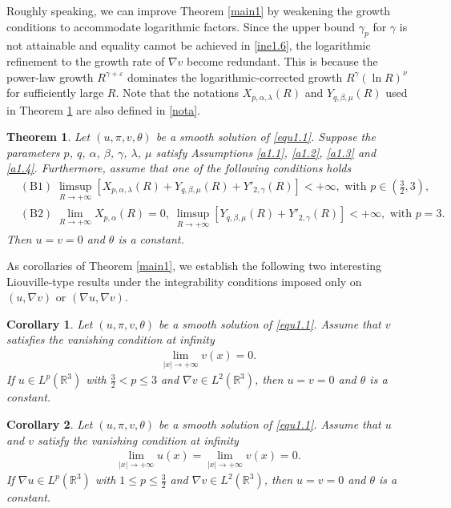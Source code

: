 \documentclass[11pt,reqno]{amsart}
\newtheorem{Thm}{Theorem}[section]
\newtheorem{Cor}{Corollary}[section]
\numberwithin{Thm}{section}
\begin{document}
Roughly speaking, we can improve Theorem \ref{main1} by weakening the growth conditions to accommodate logarithmic factors.
Since the upper bound \(\gamma_p\) for \(\gamma\) is not attainable and equality cannot be achieved in \eqref{ine1.6}, the logarithmic refinement to the growth rate of \(\nabla v\) become redundant. This is because the power-law growth \(R^{\gamma+\varepsilon}\) dominates the logarithmic-corrected growth \(R^{\gamma}(\ln R)^\nu\) for sufficiently large $R$.
Note that the notations $X_{p,\alpha,\lambda}(R)$ and $Y_{q,\beta,\mu}(R)$ used in Theorem \ref{main2} are also defined in \eqref{nota}.

\begin{Thm}\label{main2}
Let $(u,\pi,v,\theta)$ be a smooth solution of \eqref{equ1.1}. Suppose the parameters $p$, $q$, $\alpha$, $\beta$, $\gamma$, $\lambda$, $\mu$ satisfy Assumptions \ref{a1.1}, \ref{a1.2}, \ref{a1.3} and \ref{a1.4}.
Furthermore, assume that one of the following conditions holds
\begin{align*}
&\mathrm{(B1)}\;\limsup\limits_{R\rightarrow+\infty}\left[X_{p,\alpha,\lambda}(R)+Y_{q,\beta,\mu}(R)+Y'_{2,\gamma}(R)\right]<+\infty,\text{ with }p\in\left(\frac{3}{2},3\right),\\
&\mathrm{(B2)}\;\lim\limits_{R\rightarrow+\infty}X_{p,\alpha}(R)=0,\;\limsup\limits_{R\rightarrow+\infty}\left[Y_{q,\beta,\mu}(R)+Y'_{2,\gamma}(R)\right]<+\infty,\text{ with }p=3.
\end{align*}
Then $u=v=0$ and $\theta$ is a constant.
\end{Thm}

As corollaries of Theorem \ref{main1}, we establish the following two interesting Liouville-type results under the integrability conditions imposed only on $(u,\nabla v)$ or $(\nabla u,\nabla v)$.
\begin{Cor}\label{Cor1.1}
Let $(u,\pi,v,\theta)$ be a smooth solution of \eqref{equ1.1}. Assume that $v$ satisfies the vanishing condition at infinity
\begin{align*}
\lim_{|x|\rightarrow+\infty}v(x)=0.
\end{align*}
If $u\in L^p(\mathbb{R}^3)$ with $\frac{3}{2}<p\leq3$ and $\nabla v\in L^2(\mathbb{R}^3)$, then $u=v=0$ and $\theta$ is a constant.
\end{Cor}

\begin{Cor}\label{Cor1.2}
Let $(u,\pi,v,\theta)$ be a smooth solution of \eqref{equ1.1}. Assume that $u$ and $v$ satisfy the vanishing condition at infinity
\begin{align*}
\lim_{|x|\rightarrow+\infty}u(x)=\lim_{|x|\rightarrow+\infty}v(x)=0.
\end{align*}
If $\nabla u\in L^p(\mathbb{R}^3)$ with $1\leq p\leq\frac{3}{2}$ and $\nabla v\in L^2(\mathbb{R}^3)$, then $u=v=0$ and $\theta$ is a constant.
\end{Cor}
\end{document}
